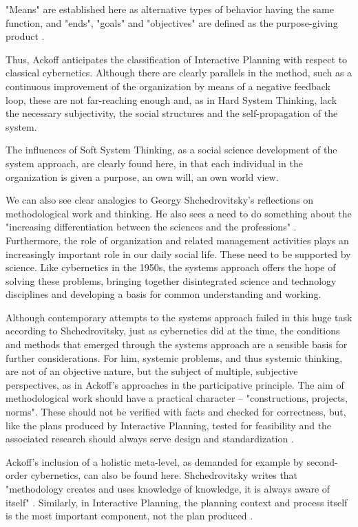\documentclass[a4paper,12pt]{article}
\begin{document}
"Means" are established here as alternative types of behavior having the same
function, and "ends", "goals" and "objectives" are defined as the
purpose-giving product \cite{chruchman:1950}.

Thus, Ackoff anticipates the classification of Interactive Planning with
respect to classical cybernetics. Although there are clearly parallels in the
method, such as a continuous improvement of the organization by means of a
negative feedback loop, these are not far-reaching enough and, as in Hard
System Thinking, lack the necessary subjectivity, the social structures and
the self-propagation of the system.

The influences of Soft System Thinking, as a social science development of the
system approach, are clearly found here, in that each individual in the
organization is given a purpose, an own will, an own world view.

We can also see clear analogies to Georgy Shchedrovitsky's reflections on
methodological work and thinking. He also sees a need to do something about
the "increasing differentiation between the sciences and the professions"
\cite{shchedrovitsky:1981}. Furthermore, the role of organization and related
management activities plays an increasingly important role in our daily social
life. These need to be supported by science. Like cybernetics in the 1950s,
the systems approach offers the hope of solving these problems, bringing
together disintegrated science and technology disciplines and developing a
basis for common understanding and working.

Although contemporary attempts to the systems approach failed in this huge
task according to Shchedrovitsky, just as cybernetics did at the time, the
conditions and methods that emerged through the systems approach are a
sensible basis for further considerations. For him, systemic problems, and
thus systemic thinking, are not of an objective nature, but the subject of
multiple, subjective perspectives, as in Ackoff's approaches in the
participative principle. The aim of methodological work should have a
practical character -- "constructions, projects, norms". These should not be
verified with facts and checked for correctness, but, like the plans produced
by Interactive Planning, tested for feasibility and the associated research
should always serve design and standardization \cite{shchedrovitsky:1981}.

Ackoff's inclusion of a holistic meta-level, as demanded for example by
second-order cybernetics, can also be found here. Shchedrovitsky writes that
"methodology creates and uses knowledge of knowledge, it is always aware of
itself" \cite{shchedrovitsky:1981}. Similarly, in Interactive Planning, the
planning context and process itself is the most important component, not the
plan produced \cite{wilbon:2012}.
\end{document}
